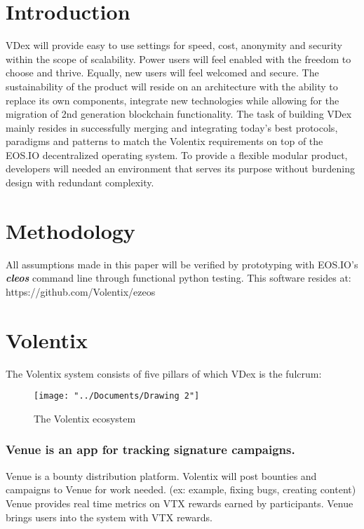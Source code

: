 \documentclass[]{article}
\begin{document}
\section{Introduction}

VDex will provide easy to use settings for speed, cost, anonymity and security within the scope of scalability. Power users will feel enabled with the freedom to choose and thrive. Equally, new users will feel welcomed and secure. The sustainability of the product will reside on an architecture 
with the ability to replace its own components, integrate new technologies while allowing for the migration of 2nd generation blockchain functionality.  
The task of building VDex mainly resides in successfully merging
and integrating today's best protocols, paradigms and patterns to match the 
Volentix requirements on top of the EOS.IO decentralized operating system.
To provide a flexible modular product, developers will needed an environment that serves its purpose without burdening design with redundant complexity. 
 	
\section{Methodology}

All assumptions made in this paper will be verified by prototyping
with EOS.IO's \textbf{\textit{cleos}} command line through functional python testing. This software resides at: https://github.com/Volentix/ezeos

\section{Volentix}	
The Volentix system consists of five pillars of which VDex is the fulcrum:
\begin{figure}
	\centering
	\texttt{[image: "../Documents/Drawing 2"]}
	\caption{The Volentix ecosystem}
	\label{fig:drawing-2}
\end{figure}
\subsubsection {Venue is an app for tracking signature campaigns.\\}

	Venue is a bounty distribution platform.
	Volentix will post bounties and campaigns to Venue for work needed.
	(ex: example, fixing bugs, creating content) Venue provides real time metrics 
	on VTX rewards earned by participants. 
	Venue brings users into the system with VTX rewards.
\end{document}
